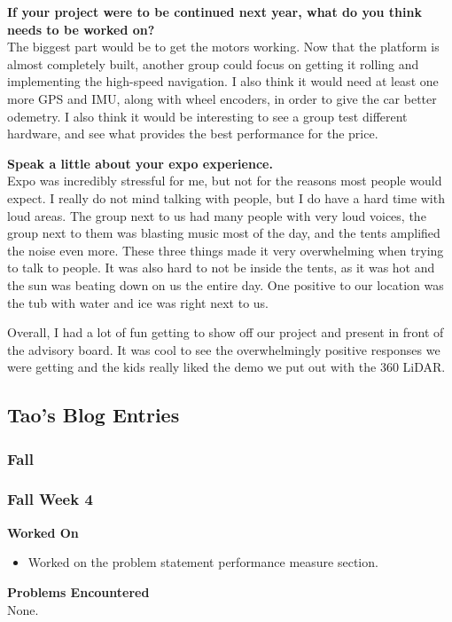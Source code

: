 \documentclass[compsoc,draftclsnofoot,onecolumn,10pt]{IEEEtran}
\begin{document}
\textbf{If your project were to be continued next year, what do you think needs to be worked on?}\\
The biggest part would be to get the motors working. Now that the platform is almost completely built, another group could focus on getting it rolling and implementing the high-speed navigation. I also think it would need at least one more GPS and IMU, along with wheel encoders, in order to give the car better odemetry. I also think it would be interesting to see a group test different hardware, and see what provides the best performance for the price.

\textbf{Speak a little about your expo experience.}\\
Expo was incredibly stressful for me, but not for the reasons most people would expect. I really do not mind talking with people, but I do have a hard time with loud areas. The group next to us had many people with very loud voices, the group next to them was blasting music most of the day, and the tents amplified the noise even more. These three things made it very overwhelming when trying to talk to people. It was also hard to not be inside the tents, as it was hot and the sun was beating down on us the entire day. One positive to our location was the tub with water and ice was right next to us.

Overall,  I had a lot of fun getting to show off our project and present in front of the advisory board. It was cool to see the overwhelmingly positive responses we were getting and the kids really liked the demo we put out with the 360 LiDAR. \par



\subsection{Tao's Blog Entries}

\subsubsection{Fall}

\subsubsection*{Fall Week 4}
\textbf{Worked On}
\begin{itemize}
  \item Worked on the problem statement performance measure section.
\end{itemize}
\textbf{Problems Encountered}\\
None.
\end{document}
